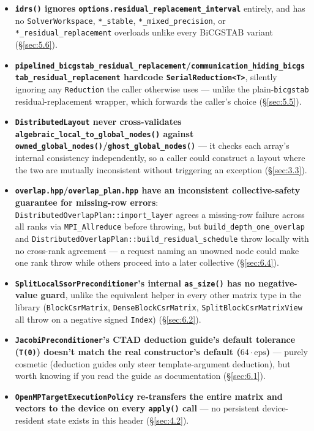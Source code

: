\documentclass[11pt,a4paper]{report}
\newcommand{\secref}[1]{\S\ref{#1}}
\begin{document}
\begin{itemize}
  verification always happens.
\item \textbf{\lstinline!idrs()! ignores
  \lstinline!options.residual_replacement_interval!} entirely, and has no
  \lstinline!SolverWorkspace!, \lstinline!*_stable!, \lstinline!*_mixed_precision!, or
  \lstinline!*_residual_replacement! overloads unlike every BiCGSTAB
  variant (\secref{sec:5.6}).
\item \textbf{\lstinline!pipelined_bicgstab_residual_replacement!/\lstinline!communication_hiding_bicgstab_residual_replacement!
  hardcode \lstinline!SerialReduction<T>!}, silently ignoring any
  \lstinline!Reduction! the caller otherwise uses --- unlike the
  plain-\lstinline!bicgstab! residual-replacement wrapper, which forwards
  the caller's choice (\secref{sec:5.5}).
\item \textbf{\lstinline!DistributedLayout! never cross-validates
  \lstinline!algebraic_local_to_global_nodes()! against
  \lstinline!owned_global_nodes()!/\lstinline!ghost_global_nodes()!} --- it checks
  each array's internal consistency independently, so a caller could
  construct a layout where the two are mutually inconsistent without
  triggering an exception (\secref{sec:3.3}).
\item \textbf{\texttt{overlap.hpp}/\texttt{overlap\_plan.hpp} have an
  inconsistent collective-safety guarantee for missing-row errors}:
  \lstinline!DistributedOverlapPlan::import_layer! agrees a missing-row
  failure across all ranks via \lstinline!MPI_Allreduce! before throwing,
  but \lstinline!build_depth_one_overlap! and
  \lstinline!DistributedOverlapPlan::build_residual_schedule! throw
  locally with no cross-rank agreement --- a request naming an
  unowned node could make one rank throw while others proceed into a
  later collective (\secref{sec:6.4}).
\item \textbf{\lstinline!SplitLocalSsorPreconditioner!'s internal
  \lstinline!as_size()! has no negative-value guard}, unlike the equivalent
  helper in every other matrix type in the library (\lstinline!BlockCsrMatrix!,
  \lstinline!DenseBlockCsrMatrix!, \lstinline!SplitBlockCsrMatrixView! all throw
  on a negative signed \lstinline!Index!) (\secref{sec:6.2}).
\item \textbf{\lstinline!JacobiPreconditioner!'s CTAD deduction guide's
  default tolerance (\lstinline!T(0)!) doesn't match the real
  constructor's default ($64\cdot\mathrm{eps}$)} --- purely cosmetic
  (deduction guides only steer template-argument deduction), but
  worth knowing if you read the guide as documentation
  (\secref{sec:6.1}).
\item \textbf{\lstinline!OpenMPTargetExecutionPolicy! re-transfers the
  entire matrix and vectors to the device on every \lstinline!apply()!
  call} --- no persistent device-resident state exists in this header
  (\secref{sec:4.2}).
\end{itemize}
\end{document}
